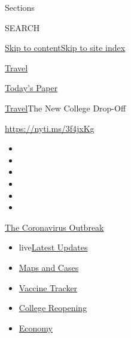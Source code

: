 Sections

SEARCH

\protect\hyperlink{site-content}{Skip to
content}\protect\hyperlink{site-index}{Skip to site index}

\href{https://www.nytimes3xbfgragh.onion/section/travel}{Travel}

\href{https://myaccount.nytimes3xbfgragh.onion/auth/login?response_type=cookie\&client_id=vi}{}

\href{https://www.nytimes3xbfgragh.onion/section/todayspaper}{Today's
Paper}

\href{/section/travel}{Travel}\textbar{}The New College Drop-Off

\url{https://nyti.ms/3f4jxKg}

\begin{itemize}
\item
\item
\item
\item
\item
\item
\end{itemize}

\href{https://www.nytimes3xbfgragh.onion/news-event/coronavirus?action=click\&pgtype=Article\&state=default\&region=TOP_BANNER\&context=storylines_menu}{The
Coronavirus Outbreak}

\begin{itemize}
\tightlist
\item
  live\href{https://www.nytimes3xbfgragh.onion/2020/08/04/world/coronavirus-cases.html?action=click\&pgtype=Article\&state=default\&region=TOP_BANNER\&context=storylines_menu}{Latest
  Updates}
\item
  \href{https://www.nytimes3xbfgragh.onion/interactive/2020/us/coronavirus-us-cases.html?action=click\&pgtype=Article\&state=default\&region=TOP_BANNER\&context=storylines_menu}{Maps
  and Cases}
\item
  \href{https://www.nytimes3xbfgragh.onion/interactive/2020/science/coronavirus-vaccine-tracker.html?action=click\&pgtype=Article\&state=default\&region=TOP_BANNER\&context=storylines_menu}{Vaccine
  Tracker}
\item
  \href{https://www.nytimes3xbfgragh.onion/2020/08/02/us/covid-college-reopening.html?action=click\&pgtype=Article\&state=default\&region=TOP_BANNER\&context=storylines_menu}{College
  Reopening}
\item
  \href{https://www.nytimes3xbfgragh.onion/live/2020/08/04/business/stock-market-today-coronavirus?action=click\&pgtype=Article\&state=default\&region=TOP_BANNER\&context=storylines_menu}{Economy}
\end{itemize}


